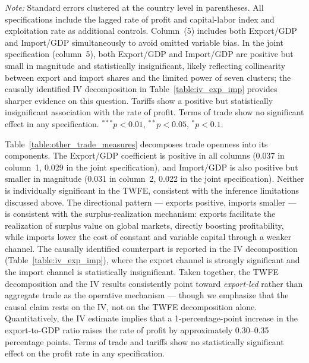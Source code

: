 \documentclass[10pt]{article}
\begin{document}
\begin{table}[!htbp]
\begin{minipage}[t]{\textwidth}
\small
\textit{Note:} Standard errors clustered at the country level in parentheses. All specifications include the lagged rate of profit and capital-labor index and exploitation rate as additional controls. Column~(5) includes both Export/GDP and Import/GDP simultaneously to avoid omitted variable bias. In the joint specification (column~5), both Export/GDP and Import/GDP are positive but small in magnitude and statistically insignificant, likely reflecting collinearity between export and import shares and the limited power of seven clusters; the causally identified IV decomposition in Table~\ref{table:iv_exp_imp} provides sharper evidence on this question. Tariffs show a positive but statistically insignificant association with the rate of profit. Terms of trade show no significant effect in any specification. $^{***}p<0.01$, $^{**}p<0.05$, $^{*}p<0.1$.
\end{minipage}
\end{table}

\par Table~\ref{table:other_trade_measures} decomposes trade openness into its components. The Export/GDP coefficient is positive in all columns (0.037 in column~1, 0.029 in the joint specification), and Import/GDP is also positive but smaller in magnitude (0.031 in column~2, 0.022 in the joint specification). Neither is individually significant in the TWFE, consistent with the inference limitations discussed above. The directional pattern --- exports positive, imports smaller --- is consistent with the surplus-realization mechanism: exports facilitate the realization of surplus value on global markets, directly boosting profitability, while imports lower the cost of constant and variable capital through a weaker channel. The causally identified counterpart is reported in the IV decomposition (Table~\ref{table:iv_exp_imp}), where the export channel is strongly significant and the import channel is statistically insignificant. Taken together, the TWFE decomposition and the IV results consistently point toward \emph{export-led} rather than aggregate trade as the operative mechanism --- though we emphasize that the causal claim rests on the IV, not on the TWFE decomposition alone. Quantitatively, the IV estimate implies that a 1-percentage-point increase in the export-to-GDP ratio raises the rate of profit by approximately 0.30--0.35 percentage points. Terms of trade and tariffs show no statistically significant effect on the profit rate in any specification.
\end{document}
